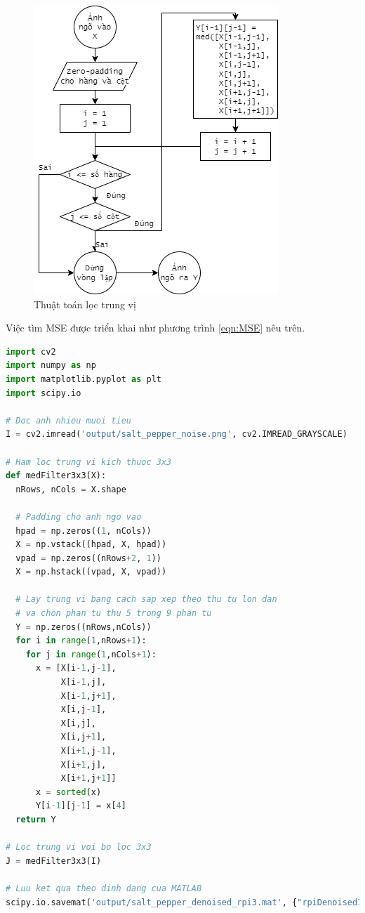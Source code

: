 \begin{figure}[h]
    \centering
    \includegraphics[width=.75\linewidth]{images/median_filtering_algorithm.png}
    \caption{Thuật toán lọc trung vị}
    \label{fig:median_filtering_algorithm}
\end{figure}

Việc tìm MSE được triển khai như phương trình \ref{eqn:MSE} nêu trên.

\begin{lstlisting}[language=Python]
import cv2
import numpy as np
import matplotlib.pyplot as plt
import scipy.io

# Doc anh nhieu muoi tieu
I = cv2.imread('output/salt_pepper_noise.png', cv2.IMREAD_GRAYSCALE)

# Ham loc trung vi kich thuoc 3x3
def medFilter3x3(X):
  nRows, nCols = X.shape

  # Padding cho anh ngo vao
  hpad = np.zeros((1, nCols))
  X = np.vstack((hpad, X, hpad))
  vpad = np.zeros((nRows+2, 1))
  X = np.hstack((vpad, X, vpad))
  
  # Lay trung vi bang cach sap xep theo thu tu lon dan
  # va chon phan tu thu 5 trong 9 phan tu
  Y = np.zeros((nRows,nCols))
  for i in range(1,nRows+1):
    for j in range(1,nCols+1):
      x = [X[i-1,j-1],
           X[i-1,j],
           X[i-1,j+1],
           X[i,j-1],
           X[i,j],
           X[i,j+1],
           X[i+1,j-1],
           X[i+1,j],
           X[i+1,j+1]]
      x = sorted(x)
      Y[i-1][j-1] = x[4]
  return Y

# Loc trung vi voi bo loc 3x3
J = medFilter3x3(I)

# Luu ket qua theo dinh dang cua MATLAB
scipy.io.savemat('output/salt_pepper_denoised_rpi3.mat', {"rpiDenoisedImg": J})
\end{lstlisting}

